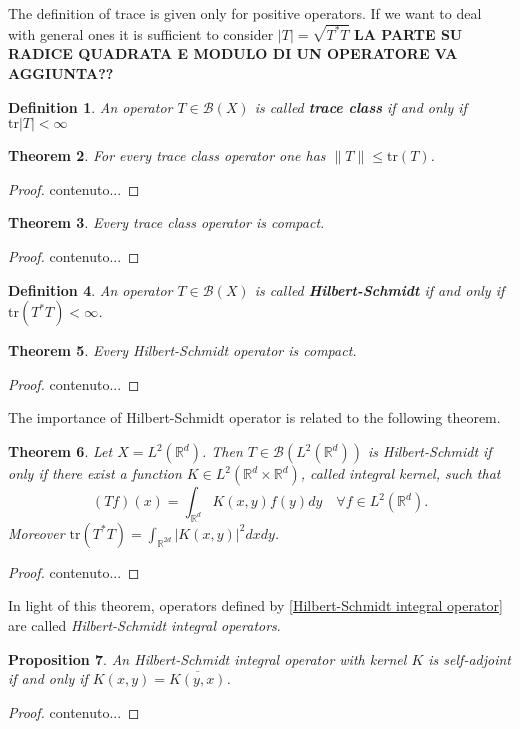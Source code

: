 \documentclass[corpo=11pt, stile=classica, tipotesi=custom,
greek, evenboxes, english]{toptesi}
\numberwithin{equation}{chapter}
\newtheorem{teo}{Theorem}[chapter] %
\newtheorem{defi}[teo]{Definition}
\newtheorem{prop}[teo]{Proposition}
\newcommand{\R}{\mathbb{R}} %
\newcommand{\B}{\mathcal{B}} %
\begin{document}
{\color{red}The definition of trace is given only for positive operators. If we want to deal with general ones it is sufficient to consider $|T|=\sqrt{T^*T}$ \textbf{LA PARTE SU RADICE QUADRATA E MODULO DI UN OPERATORE VA AGGIUNTA??}}
\begin{defi}\label{trace class def}
	An operator $T \in \B(X)$ is called \textbf{trace class} if and only if $\mathrm{tr}|T| < \infty$
\end{defi}
\begin{teo}
	For every trace class operator one has $\| T \| \leq \mathrm{tr}(T)$.
\end{teo}
\begin{proof}
	contenuto...
\end{proof}
\begin{teo}
	Every trace class operator is compact.
\end{teo}
\begin{proof}
	contenuto...
\end{proof}
\begin{defi}\label{Hilbert-Schmidt operator def}
	An operator $T \in \B(X)$ is called \textbf{Hilbert-Schmidt} if and only if $\mathrm{tr}(T^*T) < \infty$.
\end{defi}
\begin{teo}\label{Hilbert-Schmidt operators are compact}
	Every Hilbert-Schmidt operator is compact.
\end{teo}
\begin{proof}
	contenuto...
\end{proof}
The importance of Hilbert-Schmidt operator is related to the following theorem.
\begin{teo}
	Let $X = L^2(\R^d)$. Then $T \in \B(L^2(\R^d))$ is Hilbert-Schmidt if only if there exist a function $K \in L^2(\R^d \times \R^d)$, called integral kernel, such that
	\begin{equation}\label{Hilbert-Schmidt integral operator}
		(Tf)(x) = \int_{\R^d} K(x,y)f(y)dy \quad \forall f \in L^2(\R^d).
	\end{equation}
	Moreover $\mathrm{tr}(T^*T) = \int_{\R^{2d}} |K(x,y)|^2 dxdy$.
\end{teo}
\begin{proof}
	contenuto...
\end{proof}
In light of this theorem, operators defined by \eqref{Hilbert-Schmidt integral operator} are called \emph{Hilbert-Schmidt integral operators}.

\begin{prop}\label{condition integral operator self-adjoint}
	An Hilbert-Schmidt integral operator with kernel $K$ is self-adjoint if and only if $K(x,y) = \overline{K(y,x)}$.
\end{prop}
\begin{proof}
	contenuto...
\end{proof}
\end{document}
